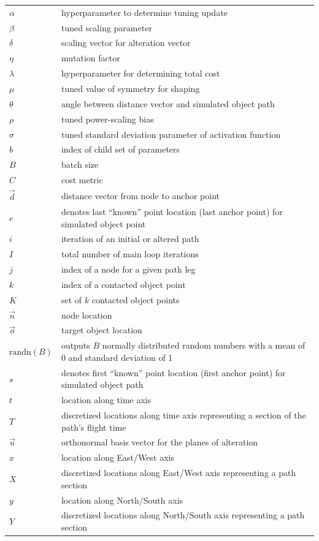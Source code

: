 \documentclass[conf]{new-aiaa}
\begin{document}
{\renewcommand\arraystretch{1.0}
\noindent\begin{longtable*}{@{}l @{\quad=\quad} l@{}}
$\alpha$ & hyperparameter to determine tuning update \\
$\beta$  & tuned scaling parameter \\
$\delta$ & scaling vector for alteration vector \\
$\eta$ & mutation factor \\
$\lambda$ & hyperparameter for determining total cost \\
$\mu$ & tuned value of symmetry for shaping \\
$\theta$ & angle between distance vector and simulated object path \\
$\rho$ & tuned power-scaling bias \\
$\sigma$ & tuned standard deviation parameter of activation function \\
$b$ & index of child set of parameters \\
$B$ & batch size \\
$C$ & cost metric \\
$\vec{d}$ & distance vector from node to anchor point\\
$e$ & denotes last ``known'' point location (last anchor point) for simulated object point \\
$i$ & iteration of an initial or altered path \\
$I$ & total number of main loop iterations \\
$j$ & index of a node for a given path leg \\
$k$ & index of a contacted object point \\
$K$ & set of $k$ contacted object points \\
$\vec{n}$ & node location \\
$\vec{o}$ & target object location \\
$\mbox{randn}(B)$ & outputs $B$ normally distributed random numbers with a mean of 0 and standard deviation of 1 \\
$s$ & denotes first ``known'' point location (first anchor point) for simulated object path \\
$t$ & location along time axis \\
$T$ & discretized locations along time axis representing a section of the path's flight time \\
$\vec{u}$ & orthonormal basis vector for the planes of alteration \\
$x$ & location along East/West axis \\
$X$ & discretized locations along East/West axis representing a path section \\
$y$ & location along North/South axis \\
$Y$ & discretized locations along North/South axis representing a path section \\
\end{longtable*}}
\end{document}
